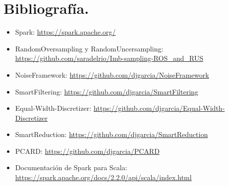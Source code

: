 \documentclass[11pt]{article}
\begin{document}
\section{Bibliografía.}

\begin{itemize}
	\item Spark: \href{https://spark.apache.org/}{https://spark.apache.org/}
	\item RandomOversampling y RandomUncersampling: \href{https://github.com/saradelrio/Imb-sampling-ROS_and\_RUS}{https://github.com/saradelrio/Imb-sampling-ROS\_and\_RUS}
	\item NoiseFramework: \href{https://github.com/djgarcia/NoiseFramework}{https://github.com/djgarcia/NoiseFramework}
	\item SmartFiltering: \href{https://github.com/djgarcia/SmartFiltering}{https://github.com/djgarcia/SmartFiltering}
	\item Equal-Width-Discretizer: \href{https://github.com/djgarcia/Equal-Width-Discretizer}{https://github.com/djgarcia/Equal-Width-Discretizer}
	\item SmartReduction: \href{https://github.com/djgarcia/SmartReduction}{https://github.com/djgarcia/SmartReduction}
	\item PCARD: \href{https://github.com/djgarcia/PCARD}{https://github.com/djgarcia/PCARD}
	\item Documentación de Spark para Scala: \href{https://spark.apache.org/docs/2.2.0/api/scala/index.html}{https://spark.apache.org/docs/2.2.0/api/scala/index.html}
\end{itemize}
\end{document}
